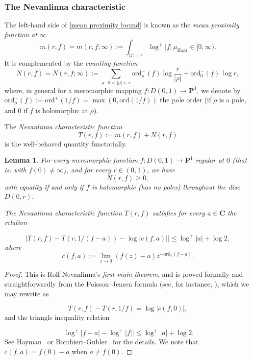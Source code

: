 \documentclass[10pt]{amsart}
\newtheorem{lemma}[subsubsection]{Lemma}
\theoremstyle{remark}
\numberwithin{equation}{subsection}
\def\numequation{\addtocounter{subsubsection}{1}\begin{equation}}
\def\C{\mathbf{C}}
\begin{document}
\subsubsection{The Nevanlinna characteristic} \label{integratedgrowthbound} 
The left-hand side of \eqref{mean proximity bound} is known as the \emph{mean proximity function at $\infty$} 
$$
m(r, f) = m(r,f ; \infty) := \int_{|z| = r} \log^+{|f|} \, \mu_{\mathrm{Haar}} \in [0,\infty).
$$
 It is complemented by the \emph{counting function}
$$
N(r,f)= N(r,f; \infty) := \sum_{\rho \, : \, 0 < |\rho| < r} \mathrm{ord}_{\rho}^-(f) \log{\frac{r}{|\rho|}} 
+ \mathrm{ord}_0^-(f) \, \log{r},
$$
where, in general for a meromorphic mapping $f : D(0,1) \to \mathbf{P}^1$, we denote by $\mathrm{ord}_{\rho}^-(f) :=  \mathrm{ord}^+(1/f) = \max(0, \mathrm{ord}(1/f))$  the pole order (if $\rho$ is a pole, and $0$ if $f$ is holomorphic at $\rho$).  

The \emph{Nevanlinna characteristic function}
$$
T(r,f)  := m(r,f) + N(r,f)
$$
is the well-behaved quantity functorially. 

\begin{lemma} \label{counting is positive}
For every meromorphic function $f : D(0,1) \to \mathbf{P}^1$ regular at $0$ (that is: with $f(0) \neq \infty$), and for every $r \in (0,1)$, we have
$$
N(r,f)  \geq 0, 
$$
with equality if and only if $f$ is holomorphic (has no poles) throughout the disc $D(0,r)$. 

The Nevanlinna characteristic function $T(r,f)$
satisfies for every $a \in \C$ the relation
\numequation \label{first main theorem}
|T(r,f)  - T(r, 1 / (f-a)) - \log{|c(f,a)|} |  \leq \log^+{|a|} + \log{2}, 
\end{equation}
where
$$
c(f,a) := \lim_{z \to 0} (f(z)-a) z^{-\mathrm{ord}_0(f-a)}.
$$
\end{lemma}

\begin{proof} 
This is Rolf Nevanlinna's \emph{first main theorem}, and is proved formally and straightforwardly from the Poisson--Jensen formula (see, for instance, \cite[Proposition~13.2.6]{BombieriGubler}), which we may rewrite as
\numequation \label{Jensen}
T(r,f)-T(r,1/f)=\log |c(f,0)|,
\end{equation}
 and the triangle inequality relation
\numequation \label{trivial}
\big| \log^+{|f-a|} - \log^+{|f|} \big| \leq \log^+{|a|} + \log{2}.
\end{equation}
See Hayman~\cite[Theorem~1.2]{Hayman} or Bombieri--Gubler~\cite[Theorem~13.2.10]{BombieriGubler} for the details. 
We note that $c(f,a) = f(0) - a$ when $a \neq f(0)$.
\end{proof}
\end{document}
